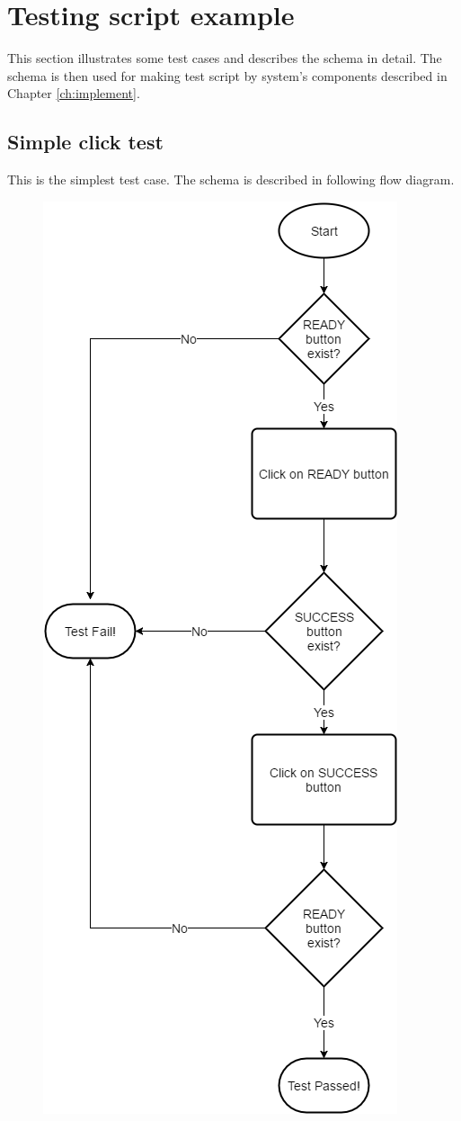 \section{Testing script example}
\label{sec:eg_script}
This section illustrates some test cases and describes the schema in detail. The schema is then used for making test script by system's components described in Chapter \ref{ch:implement}.

\subsection{Simple click test}
This is the simplest test case. The schema is described in following flow diagram.

	\begin{figure}[H]
		\centering
		\includegraphics[scale=0.55]{Chapters/Fig/click_test_diag.png}

\end{figure}

